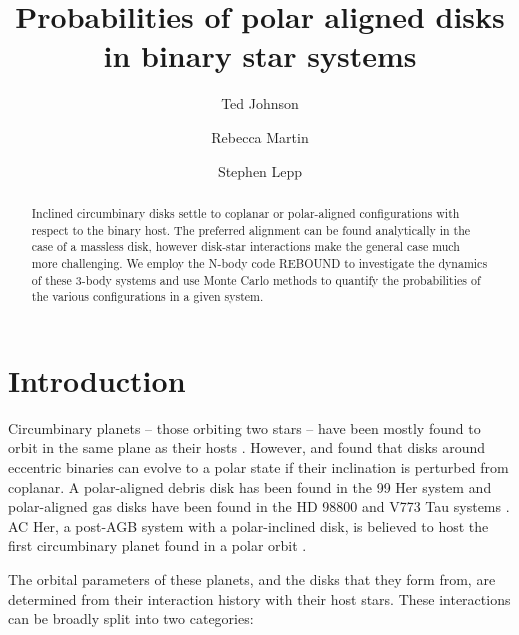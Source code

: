 \documentclass[twocolumn]{aastex631}
\begin{document}
\title{Probabilities of polar aligned disks in binary star systems}

\author{Ted Johnson}
\author{Rebecca Martin}
\author{Stephen Lepp}

\begin{abstract}
    Inclined circumbinary disks settle to coplanar or polar-aligned configurations with respect to the binary host.
    The preferred alignment can be found analytically
    in the case of a massless disk, however disk-star interactions make the general case much more challenging.
    We employ the N-body code REBOUND to investigate the dynamics of these 3-body systems and use Monte Carlo methods
    to quantify the probabilities of the various configurations in a given system.
\end{abstract}

\section{Introduction}
\label{sec:intro}



Circumbinary planets -- those orbiting two stars -- have been mostly found to orbit in the same plane as
their hosts \citep{doyle2011,orosz2012,welsh2012}. However, \citet{aly2015} and \citet{martin2017} found that disks around eccentric binaries
can evolve to a polar state if their inclination is perturbed from coplanar. A polar-aligned debris disk has been found in the 99 Her system
\citep{kennedy2012} and polar-aligned gas disks have been found in the HD 98800 and V773 Tau systems \citep[respectively]{kennedy2019,kenworthy2022}.
AC Her, a post-AGB system with a polar-inclined
disk, is believed to host the first circumbinary planet found in a polar orbit \citep{martin2023}.


The orbital parameters of these planets, and the disks that they form from, are determined from their interaction history with their
host stars. These interactions can be broadly split into two categories:
\end{document}
